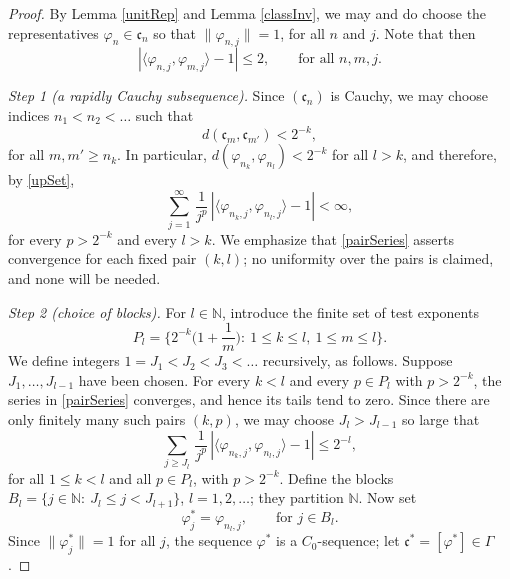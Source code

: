 \documentclass[10pt,a4paper]{amsart}
\def\bN{\mathbb{N}}
\def\fc{{\mathfrak{c}}}
\begin{document}
\begin{proof}
By Lemma \ref{unitRep} and Lemma \ref{classInv}, we may and do choose the representatives $\varphi_n\in\fc_n$ so that $\|\varphi_{n,j}\|=1$, for all $n$ and $j$. Note that then
\begin{equation}\label{unitBound}
|\langle\varphi_{n,j},\varphi_{m,j}\rangle-1|\leq 2,\qquad\text{for all }n,m,j.
\end{equation}

\smallskip\noindent\textit{Step 1 (a rapidly Cauchy subsequence).}
Since $(\fc_n)$ is Cauchy, we may choose indices $n_1<n_2<\ldots$ such that
\begin{equation}\label{rapidCauchy}
d(\fc_m,\fc_{m'})<2^{-k},
\end{equation}
for all $m,m'\geq n_k$. In particular, $d(\varphi_{n_k},\varphi_{n_l})<2^{-k}$ for all $l>k$, and therefore, by \eqref{upSet},
\begin{equation}\label{pairSeries}
\sum_{j=1}^\infty\,\frac{1}{j^p}\,|\langle \varphi_{n_k,j},\varphi_{n_l,j}\rangle-1|<\infty,
\end{equation}
for every $p>2^{-k}$ and every $l>k$. We emphasize that \eqref{pairSeries} asserts convergence for each fixed pair $(k,l)$; no uniformity over the pairs is claimed, and none will be needed.

\smallskip\noindent\textit{Step 2 (choice of blocks).}
For $l\in\bN$, introduce the finite set of test exponents
\begin{equation*}
P_l=\Big\{2^{-k}\Big(1+\frac{1}{m}\Big):\:1\leq k\leq l,\ 1\leq m\leq l\Big\}.
\end{equation*}
We define integers $1=J_1<J_2<J_3<\ldots$ recursively, as follows. Suppose $J_1,\ldots,J_{l-1}$ have been chosen. For every $k<l$ and every $p\in P_l$ with $p>2^{-k}$, the series in \eqref{pairSeries} converges, and hence its tails tend to zero. Since there are only finitely many such pairs $(k,p)$, we may choose $J_l>J_{l-1}$ so large that
\begin{equation}\label{tailBound}
\sum_{j\geq J_l}\,\frac{1}{j^p}\,|\langle \varphi_{n_k,j},\varphi_{n_l,j}\rangle-1|\leq 2^{-l},
\end{equation}
for all $1\leq k<l$ and all $p\in P_l$, with $p>2^{-k}.$ Define the blocks $B_l=\{j\in\bN:\:J_l\leq j<J_{l+1}\}$, $l=1,2,\ldots$; they partition $\bN$. Now set
\begin{equation*}
\varphi^\ast_j=\varphi_{n_l,j},\qquad\text{for }j\in B_l .
\end{equation*}
Since $\|\varphi^\ast_j\|=1$ for all $j$, the sequence $\varphi^\ast$ is a $C_0$-sequence; let $\fc^\ast=[\varphi^\ast]\in\Gamma$.


\end{proof}
\end{document}
